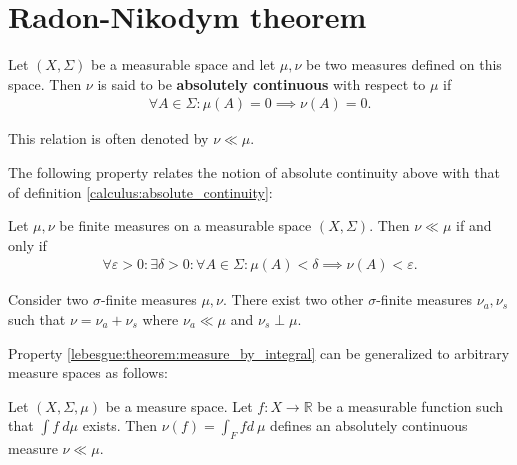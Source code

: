 \section{Radon-Nikodym theorem}\label{lebesgue:section:Radon-Nikodym}

    \begin{definition}\label{lebesgue:absolute_continuity}
        Let $(X,\Sigma)$ be a measurable space and let $\mu, \nu$ be two measures defined on this space. Then $\nu$ is said to be \textbf{absolutely continuous} with respect to $\mu$ if
        \begin{gather}
            \forall A\in\Sigma: \mu(A) = 0\implies\nu(A) = 0.
        \end{gather}
    \end{definition}
    \begin{notation}
        This relation is often denoted by $\nu\ll\mu$.
    \end{notation}

    The following property relates the notion of absolute continuity above with that of definition \ref{calculus:absolute_continuity}:
    \begin{property}
        Let $\mu, \nu$ be finite measures on a measurable space $(X, \Sigma)$. Then $\nu\ll\mu$ if and only if
        \begin{gather}
            \forall\varepsilon>0:\exists\delta>0:\forall A\in\Sigma:\mu(A)<\delta\implies\nu(A)<\varepsilon.
        \end{gather}
    \end{property}

    \begin{theorem}
        Consider two $\sigma$-finite measures $\mu,\nu$. There exist two other $\sigma$-finite measures $\nu_a, \nu_s$ such that $\nu=\nu_a+\nu_s$ where $\nu_a\ll\mu$ and $\nu_s\perp\mu$.
    \end{theorem}

    Property \ref{lebesgue:theorem:measure_by_integral} can be generalized to arbitrary measure spaces as follows:
    \begin{property}
        Let $(X,\Sigma, \mu)$ be a measure space. Let $f:X\rightarrow\mathbb{R}$ be a measurable function such that $\int f\ d\mu$ exists. Then $\nu(f) = \int_Ffd\ \mu$ defines an absolutely continuous measure $\nu\ll\mu$.
    \end{property}

